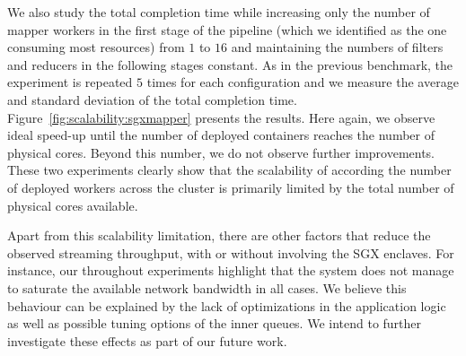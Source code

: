 We also study the total completion time while increasing only the number of mapper workers in the first stage of the pipeline (which we identified as the one consuming most resources) from $1$ to $16$ and maintaining the numbers of filters and reducers in the following stages constant.
As in the previous benchmark, the experiment is repeated $5$ times for each configuration and we measure the average and standard deviation of the total completion time.
Figure~\ref{fig:scalability:sgxmapper} presents the results.
Here again, we observe ideal speed-up until the number of deployed containers reaches the number of physical cores.
Beyond this number, we do not observe further improvements.
These two experiments clearly show that the scalability of \SYS{} according the number of deployed workers across the cluster is primarily limited by the total number of physical cores available.

Apart from this scalability limitation, there are other factors that reduce the observed streaming throughput, with or without involving the SGX enclaves.
For instance, our throughout experiments highlight that the system does not manage to saturate the available network bandwidth in all cases.
We believe this behaviour can be explained by the lack of optimizations in the application logic as well as possible tuning options of the inner \zmq{} queues.
We intend to further investigate these effects as part of our future work.

